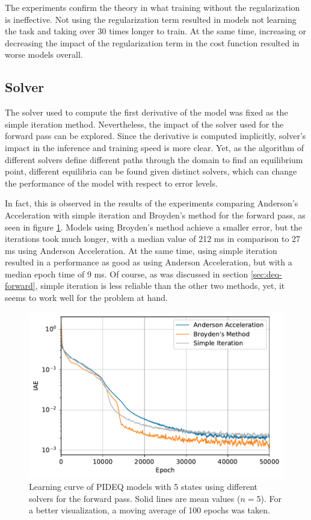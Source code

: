 The experiments confirm the theory in what training without the regularization is ineffective.
Not using the regularization term resulted in models not learning the task and taking over 30 times longer to train.
At the same time, increasing or decreasing the impact of the regularization term in the cost function resulted in worse models overall.

\subsection{Solver}

The solver used to compute the first derivative of the model was fixed as the simple iteration method.
Nevertheless, the impact of the solver used for the forward pass can be explored.
Since the derivative is computed implicitly, solver's impact in the inference and training speed is more clear.
Yet, as the algorithm of different solvers define different paths through the domain to find an equilibrium point, different equilibria can be found given distinct solvers, which can change the performance of the model with respect to error levels. 

In fact, this is observed in the results of the experiments comparing Anderson's Acceleration with simple iteration and Broyden's method\cite{broyden_class_1965} for the forward pass, as seen in figure \ref{fig:solver-iae}.
Models using Broyden's method achieve a smaller error, but the iterations took much longer, with a median value of 212 ms in comparison to 27 ms using Anderson Acceleration.
At the same time, using simple iteration resulted in a performance as good as using Anderson Acceleration, but with a median epoch time of 9 ms.
Of course, as was discussed in section \ref{sec:deq-forward}, simple iteration is less reliable than the other two methods, yet, it seems to work well for the problem at hand.

\begin{figure}[h]
    \centering
    \includegraphics{images/exp_5_iae.pdf}
    \caption{Learning curve of \gls{PIDEQ} models with 5 states using different solvers for the forward pass. Solid lines are mean values ($n=5$). For a better visualization, a moving average of 100 epochs was taken.}
    \label{fig:solver-iae}
\end{figure}

